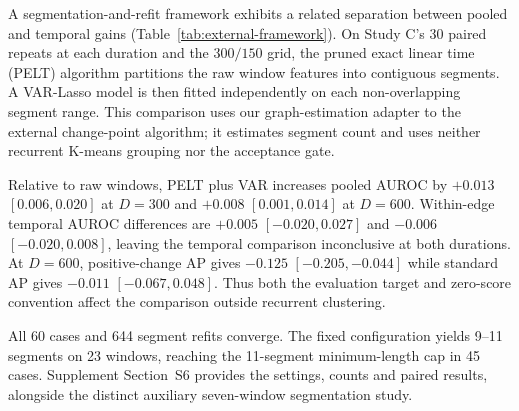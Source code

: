 A segmentation-and-refit framework exhibits a related separation between
pooled and temporal gains (Table~\ref{tab:external-framework}). On Study C's
30 paired repeats at each duration and the $300/150$ grid, the
pruned exact linear time (PELT) algorithm
partitions the raw window features into contiguous segments. A VAR-Lasso
model is then fitted independently on each non-overlapping segment range.
This comparison uses our graph-estimation adapter to the external change-point
algorithm; it estimates segment count and uses neither recurrent K-means
grouping nor the acceptance gate.

Relative to raw windows, PELT plus VAR increases pooled AUROC by $+0.013$
$[0.006,0.020]$ at $D=300$ and $+0.008$ $[0.001,0.014]$ at
$D=600$. Within-edge temporal AUROC differences are $+0.005$
$[-0.020,0.027]$ and $-0.006$ $[-0.020,0.008]$, leaving the temporal
comparison inconclusive at both durations. At $D=600$, positive-change AP
gives $-0.125$ $[-0.205,-0.044]$ while standard AP gives $-0.011$
$[-0.067,0.048]$. Thus both the evaluation target and zero-score convention
affect the comparison outside recurrent clustering.

All 60 cases and 644 segment refits converge. The fixed configuration yields
9--11 segments on 23 windows, reaching the 11-segment minimum-length cap in
45 cases. Supplement Section~S6 provides the settings, counts and paired
results, alongside the distinct auxiliary seven-window segmentation study.
